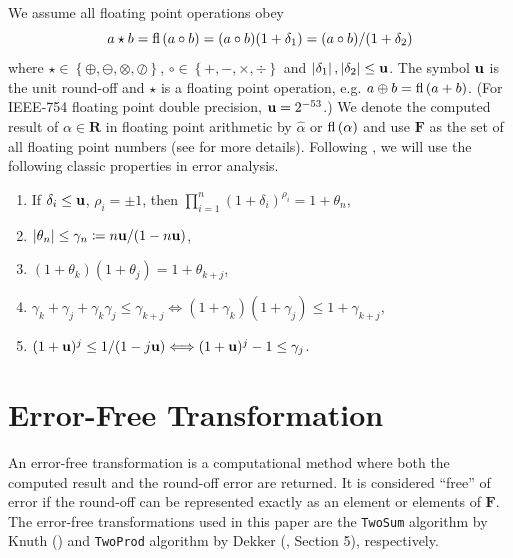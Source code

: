 We assume all floating point operations obey
\begin{equation}
  a \star b = \operatorname{fl}\left(a \circ b\right) = (a \circ b)(1 + \delta_1) =
  (a \circ b) / (1 + \delta_2)
\end{equation}
where \(\star \in \left\{\oplus, \ominus, \otimes, \oslash\right\}\), \(\circ
\in \left\{+, -, \times, \div\right\}\) and \(\left|\delta_1\right|,
\left|\delta_2\right| \leq \mathbf{u}\). The symbol \(\mathbf{u}\) is the unit round-off
and \(\star\) is a floating point operation, e.g.
\(a \oplus b = \operatorname{fl}\left(a + b\right)\). (For IEEE-754 floating point double precision,
\(\mathbf{u} = 2^{-53}\).) We denote the computed result of
\(\alpha \in \mathbf{R}\) in floating point arithmetic by
\(\widehat{\alpha}\) or \(\operatorname{fl}\left(\alpha\right)\) and use \(\mathbf{F}\) as the set of
all floating point numbers (see \cite{Higham2002} for more details).
Following \cite{Higham2002}, we will use the following classic properties in
error analysis.

\begin{enumerate}
  \item If \(\delta_i \leq \mathbf{u}\), \(\rho_i = \pm 1\), then
      \(\prod_{i = 1}^n (1 + \delta_i)^{\rho_i} = 1 + \theta_n\),
  \item \(\left|\theta_n\right| \leq \gamma_n \coloneqq
      n \mathbf{u} / (1 - n \mathbf{u})\),
  \item \((1 + \theta_k)(1 + \theta_j) = 1 + \theta_{k + j}\),
  \item \(\gamma_k + \gamma_j + \gamma_k \gamma_j \leq \gamma_{k + j}
    \Longleftrightarrow (1 + \gamma_k)(1 + \gamma_j) \leq 1 + \gamma_{k + j}\),
  \item \((1 + \mathbf{u})^j \leq 1 / (1 - j \mathbf{u}) \Longleftrightarrow
  (1 + \mathbf{u})^j - 1 \leq \gamma_j\).
\end{enumerate}

\section{Error-Free Transformation}

An error-free transformation is a computational method where both
the computed result and the round-off error are returned. It
is considered ``free'' of error if the round-off can be represented
exactly as an element or elements of \(\mathbf{F}\).
The error-free transformations used in this paper are
the \texttt{TwoSum} algorithm by Knuth (\cite{Knuth1997}) and
\texttt{TwoProd} algorithm by Dekker (\cite{Dekker1971}, Section 5),
respectively.

